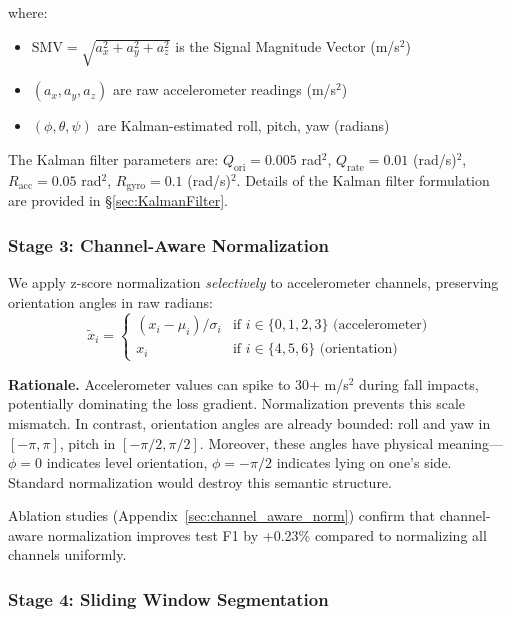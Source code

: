 where:
\begin{itemize}
\item $\text{SMV} = \sqrt{a_x^2 + a_y^2 + a_z^2}$ is the Signal Magnitude Vector (m/s$^2$)
\item $(a_x, a_y, a_z)$ are raw accelerometer readings (m/s$^2$)
\item $(\phi, \theta, \psi)$ are Kalman-estimated roll, pitch, yaw (radians)
\end{itemize}

The Kalman filter parameters are: $Q_{\text{ori}} = 0.005$ rad$^2$, $Q_{\text{rate}} = 0.01$ (rad/s)$^2$, $R_{\text{acc}} = 0.05$ rad$^2$, $R_{\text{gyro}} = 0.1$ (rad/s)$^2$. Details of the Kalman filter formulation are provided in \S\ref{sec:KalmanFilter}.

\subsubsection{Stage 3: Channel-Aware Normalization}

We apply z-score normalization \textit{selectively} to accelerometer channels, preserving orientation angles in raw radians:
\begin{equation}
\tilde{x}_i = \begin{cases}
(x_i - \mu_i) / \sigma_i & \text{if } i \in \{0,1,2,3\} \text{ (accelerometer)} \\
x_i & \text{if } i \in \{4,5,6\} \text{ (orientation)}
\end{cases}
\label{eq:channel_norm}
\end{equation}

\textbf{Rationale.} Accelerometer values can spike to 30+ m/s$^2$ during fall impacts, potentially dominating the loss gradient. Normalization prevents this scale mismatch. In contrast, orientation angles are already bounded: roll and yaw in $[-\pi, \pi]$, pitch in $[-\pi/2, \pi/2]$. Moreover, these angles have physical meaning---$\phi = 0$ indicates level orientation, $\phi = -\pi/2$ indicates lying on one's side. Standard normalization would destroy this semantic structure.

Ablation studies (Appendix~\ref{sec:channel_aware_norm}) confirm that channel-aware normalization improves test F1 by +0.23\% compared to normalizing all channels uniformly.

\subsubsection{Stage 4: Sliding Window Segmentation}

